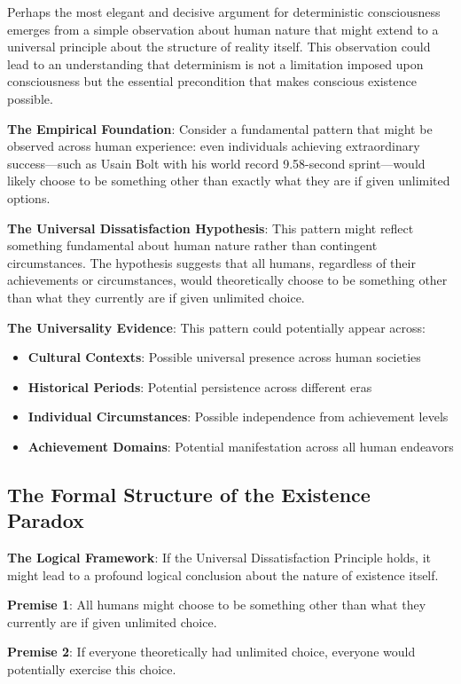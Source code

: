\documentclass[12pt]{article}
\begin{document}
Perhaps the most elegant and decisive argument for deterministic consciousness emerges from a simple observation about human nature that might extend to a universal principle about the structure of reality itself. This observation could lead to an understanding that determinism is not a limitation imposed upon consciousness but the essential precondition that makes conscious existence possible.

\textbf{The Empirical Foundation}: Consider a fundamental pattern that might be observed across human experience: even individuals achieving extraordinary success—such as Usain Bolt with his world record 9.58-second sprint—would likely choose to be something other than exactly what they are if given unlimited options.

\textbf{The Universal Dissatisfaction Hypothesis}: This pattern might reflect something fundamental about human nature rather than contingent circumstances. The hypothesis suggests that all humans, regardless of their achievements or circumstances, would theoretically choose to be something other than what they currently are if given unlimited choice.

\textbf{The Universality Evidence}: This pattern could potentially appear across:
\begin{itemize}
\item \textbf{Cultural Contexts}: Possible universal presence across human societies
\item \textbf{Historical Periods}: Potential persistence across different eras
\item \textbf{Individual Circumstances}: Possible independence from achievement levels
\item \textbf{Achievement Domains}: Potential manifestation across all human endeavors
\end{itemize}

\subsection{The Formal Structure of the Existence Paradox}

\textbf{The Logical Framework}: If the Universal Dissatisfaction Principle holds, it might lead to a profound logical conclusion about the nature of existence itself.

\textbf{Premise 1}: All humans might choose to be something other than what they currently are if given unlimited choice.

\textbf{Premise 2}: If everyone theoretically had unlimited choice, everyone would potentially exercise this choice.
\end{document}
